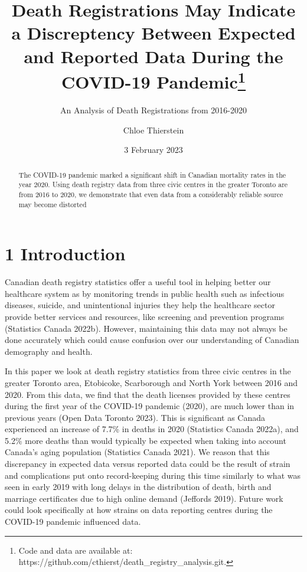 \documentclass[
  letterpaper,
  DIV=11,
  numbers=noendperiod]{scrartcl}
\title{Death Registrations May Indicate a Discreptency Between Expected
and Reported Data During the COVID-19 Pandemic\thanks{Code and data are
available at:
https://github.com/cthierst/death\_registry\_analysis.git.}}
\subtitle{An Analysis of Death Registrations from 2016-2020}
\author{Chloe Thierstein}
\date{3 February 2023}
\begin{document}
\maketitle
\begin{abstract}
The COVID-19 pandemic marked a significant shift in Canadian mortality
rates in the year 2020. Using death registry data from three civic
centres in the greater Toronto are from 2016 to 2020, we demonstrate
that even data from a considerably reliable source may become distorted
\end{abstract}
\ifdefined\Shaded\renewenvironment{Shaded}{\begin{tcolorbox}[interior hidden, boxrule=0pt, enhanced, borderline west={3pt}{0pt}{shadecolor}, breakable, frame hidden, sharp corners]}{\end{tcolorbox}}\fi

\hypertarget{introduction}{%
\section{1 Introduction}\label{introduction}}

Canadian death registry statistics offer a useful tool in helping better
our healthcare system as by monitoring trends in public health such as
infectious diseases, suicide, and unintentional injuries they help the
healthcare sector provide better services and resources, like screening
and prevention programs (Statistics Canada 2022b). However, maintaining
this data may not always be done accurately which could cause confusion
over our understanding of Canadian demography and health.

In this paper we look at death registry statistics from three civic
centres in the greater Toronto area, Etobicoke, Scarborough and North
York between 2016 and 2020. From this data, we find that the death
licenses provided by these centres during the first year of the COVID-19
pandemic (2020), are much lower than in previous years (Open Data
Toronto 2023). This is significant as Canada experienced an increase of
7.7\% in deaths in 2020 (Statistics Canada 2022a), and 5.2\% more deaths
than would typically be expected when taking into account Canada's aging
population (Statistics Canada 2021). We reason that this discrepancy in
expected data versus reported data could be the result of strain and
complications put onto record-keeping during this time similarly to what
was seen in early 2019 with long delays in the distribution of death,
birth and marriage certificates due to high online demand (Jeffords
2019). Future work could look specifically at how strains on data
reporting centres during the COVID-19 pandemic influenced data.
\end{document}
